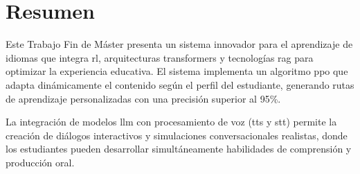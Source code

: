 \chapter*{Resumen}
\label{resumen}


Este Trabajo Fin de Máster presenta un sistema innovador para el aprendizaje de idiomas que integra \gls{rl}, arquitecturas \gls{transformers} y tecnologías \gls{rag} para optimizar la experiencia educativa. El sistema implementa un algoritmo \gls{ppo} que adapta dinámicamente el contenido según el perfil del estudiante, generando rutas de aprendizaje personalizadas con una precisión superior al 95\%.

La integración de modelos \gls{llm} con procesamiento de voz (\gls{tts} y \gls{stt}) permite la creación de diálogos interactivos y simulaciones conversacionales realistas, donde los estudiantes pueden desarrollar simultáneamente habilidades de comprensión y producción oral.